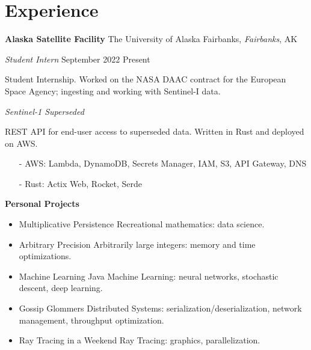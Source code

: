 ﻿\section{Experience}

\textbf{Alaska Satellite Facility}
\hfill
The University of Alaska Fairbanks, \textit{Fairbanks}, AK

\textit{Student Intern}
\hfill
{September 2022 \textendash Present}

\bigbreak

Student Internship. Worked on the NASA DAAC contract for the European Space Agency; ingesting and working with Sentinel-I data.

\bigbreak

\textit{Sentinel-1 Superseded}

REST API for end-user access to superseded data. Written in Rust and deployed on AWS.
\begin{itemize}\setlength\itemsep{-0.15cm}
    \item [-] AWS: Lambda, DynamoDB, Secrets Manager, IAM, S3, API Gateway, DNS
    \item [-] Rust: Actix Web, Rocket, Serde
\end{itemize}

\textbf{Personal Projects}

\begin{itemize}\setlength\itemsep{0cm}
    \item Multiplicative Persistence \textendash Recreational mathematics: data science.

    \item Arbitrary Precision \textendash Arbitrarily large integers: memory and time optimizations.
    
    \item Machine Learning Java \textendash Machine Learning: neural networks, stochastic descent, deep learning.

    \item Gossip Glommers \textendash Distributed Systems: serialization/deserialization, network management, throughput optimization.

    \item Ray Tracing in a Weekend \textendash Ray Tracing: graphics, parallelization.
\end{itemize}
